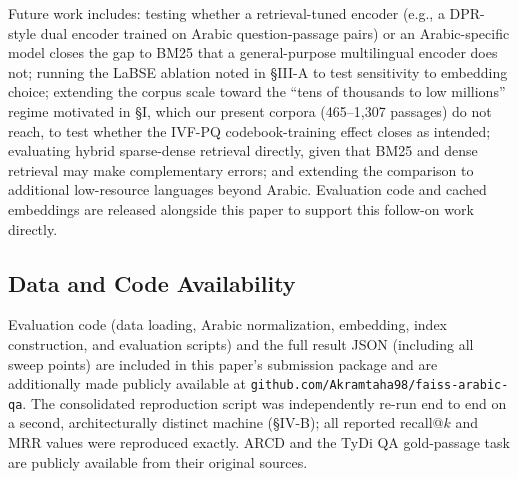 \documentclass[conference]{IEEEtran}
\begin{document}
Future work includes: testing whether a retrieval-tuned encoder (e.g., a DPR-style dual encoder trained on Arabic question-passage pairs) or an Arabic-specific model closes the gap to BM25 that a general-purpose multilingual encoder does not; running the LaBSE ablation noted in \S III-A to test sensitivity to embedding choice; extending the corpus scale toward the ``tens of thousands to low millions'' regime motivated in \S I, which our present corpora (465--1{,}307 passages) do not reach, to test whether the IVF-PQ codebook-training effect closes as intended; evaluating hybrid sparse-dense retrieval directly, given that BM25 and dense retrieval may make complementary errors; and extending the comparison to additional low-resource languages beyond Arabic. Evaluation code and cached embeddings are released alongside this paper to support this follow-on work directly.

\subsection*{Data and Code Availability}
Evaluation code (data loading, Arabic normalization, embedding, index construction, and evaluation scripts) and the full result JSON (including all sweep points) are included in this paper's submission package and are additionally made publicly available at \texttt{github.com/Akramtaha98/faiss-arabic-qa}. The consolidated reproduction script was independently re-run end to end on a second, architecturally distinct machine (\S IV-B); all reported recall@$k$ and MRR values were reproduced exactly. ARCD \cite{mozannar2019neural} and the TyDi QA gold-passage task \cite{clark2020tydi} are publicly available from their original sources.



\end{document}
